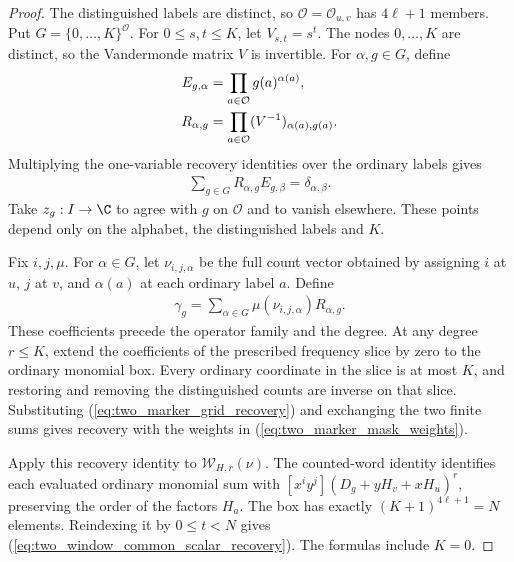 \begin{proof}\leanok
    The distinguished labels are distinct, so $\mathcal O=\mathcal O_{u,v}$
    has $4\ell+1$ members. Put $G=\{0,\ldots,K\}^{\mathcal O}$.
    For $0\le s,t\le K$, let $V_{s,t}=s^t$.
    The nodes $0,\ldots,K$ are distinct, so the Vandermonde matrix $V$ is
    invertible. For $\alpha,g\in G$, define
    \begin{align}
        E_{g,\alpha} & =\prod_{a\in\mathcal O}g(a)^{\alpha(a)}, \notag   \\
        R_{\alpha,g} & =\prod_{a\in\mathcal O}(V^{-1})_{\alpha(a),g(a)}.
        \label{eq:two_marker_grid_weights}
    \end{align}
    Multiplying the one-variable recovery identities over the ordinary labels gives
    \begin{align}
        \sum_{g\in G}R_{\alpha,g}E_{g,\beta}=\delta_{\alpha,\beta}.
        \label{eq:two_marker_grid_recovery}
    \end{align}
    Take $z_g:I\to\C$ to agree with $g$ on $\mathcal O$ and to vanish
    elsewhere. These points depend only on the alphabet, the distinguished
    labels and $K$.

    Fix $i,j,\mu$. For $\alpha\in G$, let $\nu_{i,j,\alpha}$ be the
    full count vector obtained by assigning $i$ at $u$, $j$ at $v$, and
    $\alpha(a)$ at each ordinary label $a$. Define
    \begin{align}
        \gamma_g=\sum_{\alpha\in G}\mu(\nu_{i,j,\alpha})R_{\alpha,g}.
        \label{eq:two_marker_mask_weights}
    \end{align}
    These coefficients precede the operator family and the degree.
    At any degree $r\le K$, extend the coefficients of the prescribed
    frequency slice by zero to the ordinary monomial box. Every ordinary
    coordinate in the slice is at most $K$, and restoring and removing the
    distinguished counts are inverse on that slice. Substituting
    (\ref{eq:two_marker_grid_recovery}) and exchanging the two finite sums
    gives recovery with the weights in (\ref{eq:two_marker_mask_weights}).

    Apply this recovery identity to $\mathcal W_{H,r}(\nu)$.
    The counted-word identity identifies each evaluated ordinary monomial sum
    with $[x^iy^j](D_g+yH_v+xH_u)^r$, preserving the order of the factors
    $H_a$. The box has exactly $(K+1)^{4\ell+1}=N$ elements.
    Reindexing it by $0\le t<N$ gives
    (\ref{eq:two_window_common_scalar_recovery}). The formulas include $K=0$.
\end{proof}
